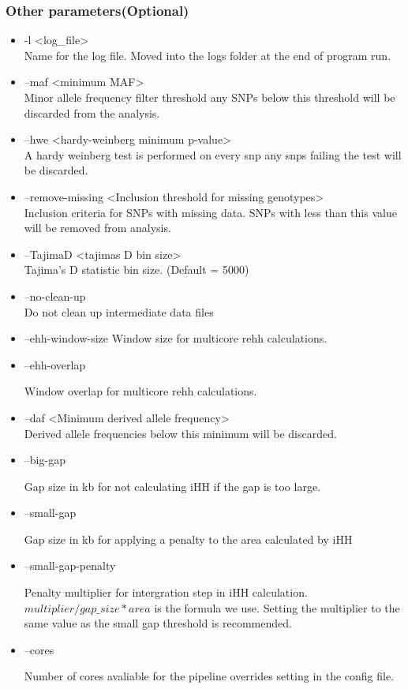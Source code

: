 \subsubsection{Other parameters(Optional)}
\begin{itemize}
\item -l <log\_file> \\
Name for the log file. Moved into the logs folder at the end of program run.
\item --maf <minimum MAF>\\
Minor allele frequency filter threshold any SNPs below this threshold will be discarded from the analysis.
\item --hwe <hardy-weinberg minimum p-value>\\
A hardy weinberg test is performed on every snp any snps failing the test will be discarded.
\item --remove-missing <Inclusion threshold for missing genotypes>\\
Inclusion criteria for SNPs with missing data. SNPs with less than this value will be removed from analysis.
\item --TajimaD <tajimas D bin size>\\
Tajima's D statistic bin size. (Default = 5000)
\item --no-clean-up \\
Do not clean up intermediate data files

\item --ehh-window-size
Window size for multicore rehh calculations.  

\item --ehh-overlap

Window overlap for multicore rehh calculations.

\item --daf <Minimum derived allele frequency>\\
Derived allele frequencies below this minimum will be discarded.

\item --big-gap

Gap size in kb for not calculating iHH if the gap is too large.

\item --small-gap

Gap size in kb for applying a penalty to the area calculated by iHH

\item --small-gap-penalty

Penalty multiplier for intergration step in iHH calculation. $multiplier/gap\_size * area$ is the formula we use. Setting the multiplier to the same value as the small gap threshold is recommended.

\item --cores 

Number of cores avaliable for the pipeline overrides setting in the config file.

\end{itemize}
